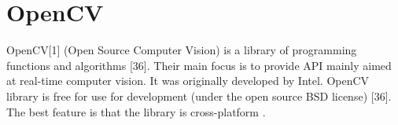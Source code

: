 \section{OpenCV}
OpenCV[1] (Open Source Computer Vision) is a library of programming functions and algorithms
[36]. Their main focus is to provide API mainly aimed at real-time computer vision. It was
originally developed by Intel. OpenCV library is free for use for development (under the open
source BSD license) [36]. The best feature is that the library is cross-platform . 